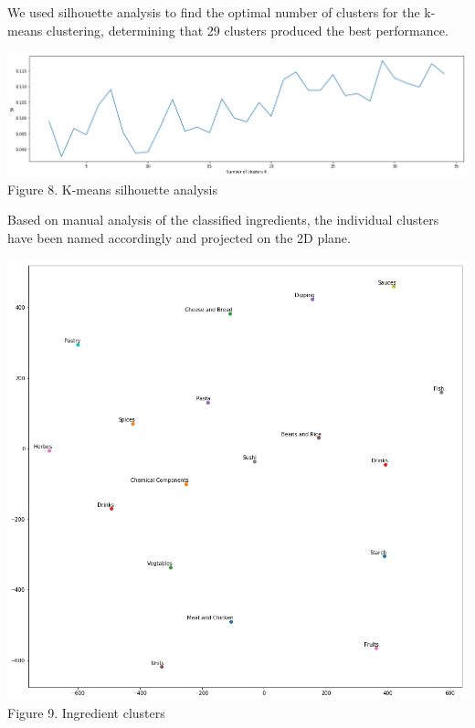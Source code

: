 \documentclass[11pt]{article}
\begin{document}
We used silhouette analysis to find the optimal number of clusters for the k-means clustering, determining that 29 clusters produced the best performance.

\vspace{5mm}
\begin{center}
\includegraphics[scale=0.18]{ingredient-kmeans}
\label{visalization-cookingtime} Figure 8. K-means silhouette analysis
\end{center}
\vspace{5mm}

Based on manual analysis of the classified ingredients, the individual clusters have been named accordingly and projected on the 2D plane.

\vspace{5mm}
\begin{center}
\includegraphics[scale=0.24]{ingredient-clusters}
\label{visalization-cookingtime} Figure 9. Ingredient clusters
\end{center}
\vspace{5mm}
\end{document}
